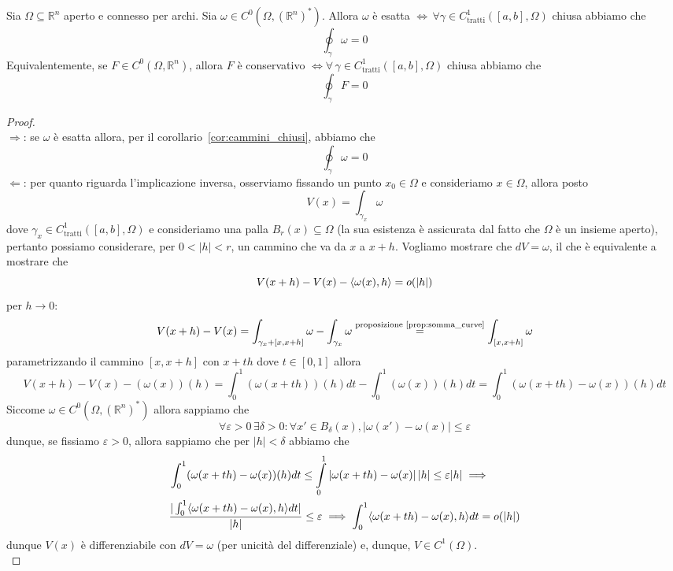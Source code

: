 \begin{theorem}[CF1]
Sia $\Omega \subseteq \mathbb{R}^n$ aperto e connesso per archi. Sia $\omega \in C^0(\Omega, (\mathbb{R}^n)^*)$. Allora $\omega$ è esatta $\iff \, \forall \gamma \in C^1_\text{tratti} ([a, b], \Omega)$ chiusa abbiamo che
$$
\oint_\gamma \omega = 0
$$
Equivalentemente, se $F \in C^0(\Omega, \mathbb{R}^n)$, allora $F$ è conservativo $\iff \forall \, \gamma \in C^1_\text{tratti}([a, b], \Omega)$ chiusa abbiamo che
$$
\oint_\gamma F = 0
$$
\label{thm:teo_cf1}
\end{theorem}
\begin{proof} \hspace{1cm} \\
$\boxed{\Rightarrow}$: se $\omega$ è esatta allora, per il corollario~\ref{cor:cammini_chiusi}, abbiamo che
$$
\oint_\gamma \omega = 0
$$
$\boxed{\Leftarrow}$: per quanto riguarda l'implicazione inversa, osserviamo fissando un punto $x_0 \in \Omega$ e consideriamo $x \in \Omega$, allora posto
$$
V(x) = \int_{\gamma_x} \omega
$$
dove $\gamma_x \in C^1_\text{tratti}([a, b], \Omega)$ e consideriamo una palla $B_r(x) \subseteq \Omega$ (la sua esistenza è assicurata dal fatto che $\Omega$ è un insieme aperto), pertanto possiamo considerare, per $0 < |h| < r$, un cammino che va da $x$ a $x+h$. Vogliamo mostrare che $dV =\omega$, il che è equivalente a mostrare che $$V(x+h) - V(x) - \langle \omega(x), h \rangle = o(|h|)$$ per $h \to 0$:
$$
V(x+h) - V(x) = \int_{\gamma_x + [x, x+h]} \omega - \int_{\gamma_x} \omega \stackrel{\text{proposizione~\ref{prop:somma_curve}}}{=} \int_{[x, x+h]} \omega
$$
parametrizzando il cammino $[x, x+h]$ con $x + th$ dove $t \in [0,1]$ allora
$$
V(x+h)-V(x) - (\omega(x))(h) = \int_0^1 (\omega(x + th))(h) dt - \int_0^1 (\omega(x))(h) dt = \int_0^1 (\omega(x + th) - \omega(x))(h)dt
$$
Siccome $\omega \in C^0(\Omega, (\mathbb{R}^n)^*)$ allora sappiamo che
$$
\forall \varepsilon > 0 \, \exists \delta > 0: \forall x' \in B_\delta(x), |\omega(x') - \omega(x)| \leq \varepsilon
$$
dunque, se fissiamo $\varepsilon > 0$, allora sappiamo che per $|h| < \delta$ abbiamo che
\begin{align*}
&\int_0^1 (\omega(x + th) - \omega(x))(h)dt \leq \int\limits_0^1 |\omega(x + th) - \omega(x) | \, |h| \leq \varepsilon |h| \implies \\
&\frac{|\int_0^1 \langle \omega(x + th) - \omega(x), h \rangle dt|}{|h|} \leq \varepsilon \implies \int_0^1 \langle \omega(x + th) - \omega(x), h \rangle dt = o(|h|) 
\end{align*}
dunque $V(x)$ è differenziabile con $dV = \omega$ (per unicità del differenziale) e, dunque, $V \in C^1(\Omega)$. \\

\end{proof}
